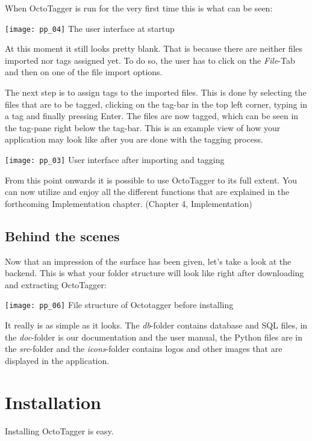 When OctoTagger is run for the very first time this is what can be seen:

\begin{center}
\texttt{[image: pp\_04]}
\small{The user interface at startup}
\end{center}


At this moment it still looks pretty blank. That is because there are neither files imported nor tags assigned yet. To do so, the user has to click on the \emph{File}-Tab and then on one of the file import options.

The next step is to assign tags to the imported files. This is done by selecting the files that are to be tagged, clicking on the tag-bar in the top left corner, typing in a tag and finally pressing Enter. The files are now tagged, which can be seen in the tag-pane right below the tag-bar.
This is an example view of how your application may look like after you are done with the tagging process.

\begin{center}
\texttt{[image: pp\_03]}
\small{User interface after importing and tagging}
\end{center}


From this point onwards it is possible to use OctoTagger to its full extent. You can now utilize and enjoy all the different functions that are explained in the forthcoming Implementation chapter. (Chapter 4, Implementation)

\subsection{Behind the scenes}
Now that an impression of the surface has been given, let's take a look at the backend. This is what your folder structure will look like right after downloading and extracting OctoTagger:

\begin{center}
\texttt{[image: pp\_06]}
\small{File structure of Octotagger before installing}
\end{center}

It really is as simple as it looks. The \emph{db}-folder contains database and SQL files, in the \emph{doc}-folder is our documentation and the user manual, the Python files are in the \emph{src}-folder and the \emph{icons}-folder contains logos and other images that are displayed in the application.

\section{Installation}
Installing OctoTagger is easy.

